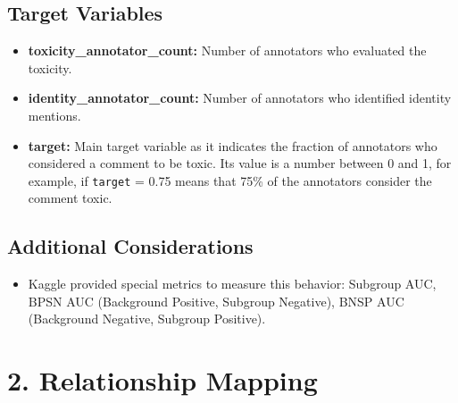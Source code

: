 \documentclass[a4paper,12pt]{article}
\begin{document}
\subsection*{Target Variables}
\begin{itemize}
\item \textbf{toxicity\_annotator\_count:} Number of annotators who evaluated the toxicity.
\item \textbf{identity\_annotator\_count:} Number of annotators who identified identity mentions.
\item \textbf{target:} Main target variable as it indicates the fraction of annotators who considered a comment to be toxic. Its value is a number between 0 and 1, for example, if \texttt{target} = 0.75 means that 75\% of the annotators consider the comment toxic.
\end{itemize}
\subsection*{Additional Considerations}
\begin{itemize}
\item Kaggle provided special metrics to measure this behavior: Subgroup AUC, BPSN AUC (Background Positive, Subgroup Negative), BNSP AUC (Background Negative, Subgroup Positive).
\end{itemize}

\section*{2. Relationship Mapping}
\end{document}
